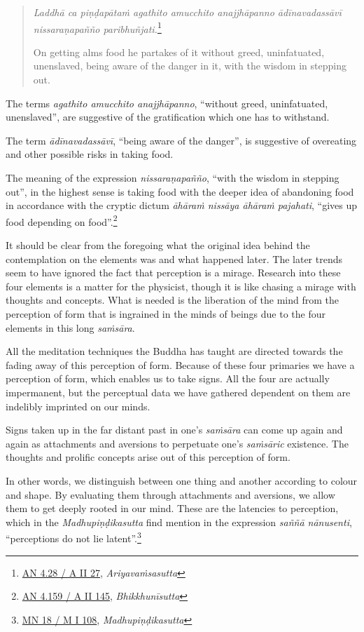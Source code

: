 \begin{quote}
\emph{Laddhā ca piṇḍapātaṁ agathito amucchito anajjhāpanno ādīnavadassāvī nissaraṇapañño paribhuñjati.}\footnote{\href{https://suttacentral.net/an4.28/pli/ms}{AN 4.28 / A II 27}, \emph{Ariyavaṁsasutta}}

On getting alms food he partakes of it without greed, uninfatuated, unenslaved, being aware of the danger in it, with the wisdom in stepping out.
\end{quote}

The terms \emph{agathito amucchito anajjhāpanno}, ``without greed, uninfatuated, unenslaved'', are suggestive of the gratification which one has to withstand.

The term \emph{ādīnavadassāvī}, ``being aware of the danger'', is suggestive of overeating and other possible risks in taking food.

\clearpage

The meaning of the expression \emph{nissaraṇapañño}, ``with the wisdom in stepping out'', in the highest sense is taking food with the deeper idea of abandoning food in accordance with the cryptic dictum \emph{āhāraṁ nissāya āhāraṁ pajahati}, ``gives up food depending on food''.\footnote{\href{https://suttacentral.net/an4.159/pli/ms}{AN 4.159 / A II 145}, \emph{Bhikkhunīsutta}}

It should be clear from the foregoing what the original idea behind the contemplation on the elements was and what happened later. The later trends seem to have ignored the fact that perception is a mirage. Research into these four elements is a matter for the physicist, though it is like chasing a mirage with thoughts and concepts. What is needed is the liberation of the mind from the perception of form that is ingrained in the minds of beings due to the four elements in this long \emph{saṁsāra}.

All the meditation techniques the Buddha has taught are directed towards the fading away of this perception of form. Because of these four primaries we have a perception of form, which enables us to take signs. All the four are actually impermanent, but the perceptual data we have gathered dependent on them are indelibly imprinted on our minds.

Signs taken up in the far distant past in one's \emph{saṁsāra} can come up again and again as attachments and aversions to perpetuate one's \emph{saṁsāric} existence. The thoughts and prolific concepts arise out of this perception of form.

In other words, we distinguish between one thing and another according to colour and shape. By evaluating them through attachments and aversions, we allow them to get deeply rooted in our mind. These are the latencies to perception, which in the \emph{Madhupiṇḍikasutta} find mention in the expression \emph{saññā nānusenti}, ``perceptions do not lie latent''.\footnote{\href{https://suttacentral.net/mn18/pli/ms}{MN 18 / M I 108}, \emph{Madhupiṇḍikasutta}}

